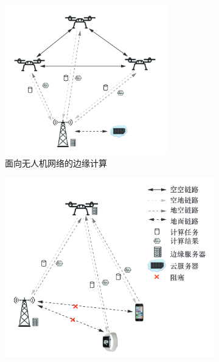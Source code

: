 \begin{figure}[!htbp]
    \centering
    \begin{subfigure}[t]{0.4\textwidth}
        \captionsetup{justification=centering}
        \begin{minipage}[b]{1\linewidth}
            \includegraphics[width=\textwidth]{images/面向无人机网络的边缘计算.png}
            \caption{面向无人机网络的边缘计算}
            \label{fig:面向无人机网络的边缘计算}
        \end{minipage}
    \end{subfigure}
    \begin{subfigure}[t]{0.55\textwidth}
        \captionsetup{justification=centering}
        \begin{minipage}[b]{1\linewidth}
            \includegraphics[width=\textwidth]{images/面向地面网络的无人机边缘智能计算.png}

\end{minipage}
\end{subfigure}
\end{figure}
